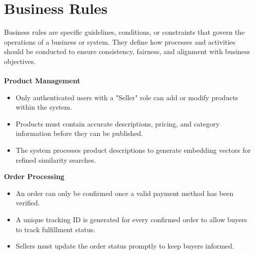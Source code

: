 \section{Business Rules}
Business rules are specific guidelines, conditions, or constraints that govern the operations of a business or system. They define how processes and activities should be conducted to ensure consistency, fairness, and alignment with business objectives.\\\\
\textbf{Product Management}
\begin{itemize}
    \item Only authenticated users with a "Seller" role can add or modify products within the system.
    \item Products must contain accurate descriptions, pricing, and category information before they can be published.
    \item The system processes product descriptions to generate embedding vectors for refined similarity searches.
\end{itemize}
\textbf{Order Processing}
\begin{itemize}
    \item An order can only be confirmed once a valid payment method has been verified.
    \item A unique tracking ID is generated for every confirmed order to allow buyers to track fulfillment status.
    \item Sellers must update the order status promptly to keep buyers informed.
\end{itemize}

\newpage
